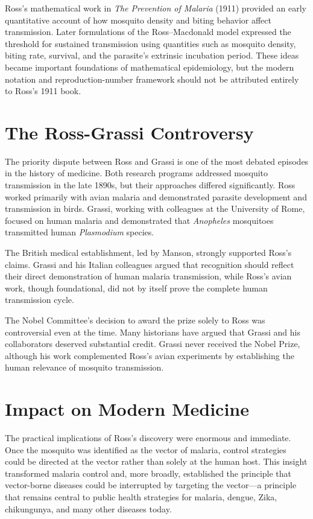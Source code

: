 Ross's mathematical work in \emph{The Prevention of Malaria} (1911) provided an early quantitative account of how mosquito density and biting behavior affect transmission. Later formulations of the Ross--Macdonald model expressed the threshold for sustained transmission using quantities such as mosquito density, biting rate, survival, and the parasite's extrinsic incubation period. These ideas became important foundations of mathematical epidemiology, but the modern notation and reproduction-number framework should not be attributed entirely to Ross's 1911 book.\cite{malaria-modeling}

\section{The Ross-Grassi Controversy}

The priority dispute between Ross and Grassi is one of the most debated episodes in the history of medicine. Both research programs addressed mosquito transmission in the late 1890s, but their approaches differed significantly. Ross worked primarily with avian malaria and demonstrated parasite development and transmission in birds. Grassi, working with colleagues at the University of Rome, focused on human malaria and demonstrated that \emph{Anopheles} mosquitoes transmitted human \emph{Plasmodium} species.\cite{malaria-history}

The British medical establishment, led by Manson, strongly supported Ross's claims. Grassi and his Italian colleagues argued that recognition should reflect their direct demonstration of human malaria transmission, while Ross's avian work, though foundational, did not by itself prove the complete human transmission cycle.

The Nobel Committee's decision to award the prize solely to Ross was controversial even at the time. Many historians have argued that Grassi and his collaborators deserved substantial credit. Grassi never received the Nobel Prize, although his work complemented Ross's avian experiments by establishing the human relevance of mosquito transmission.

\section{Impact on Modern Medicine}

The practical implications of Ross's discovery were enormous and immediate. Once the mosquito was identified as the vector of malaria, control strategies could be directed at the vector rather than solely at the human host. This insight transformed malaria control and, more broadly, established the principle that vector-borne diseases could be interrupted by targeting the vector---a principle that remains central to public health strategies for malaria, dengue, Zika, chikungunya, and many other diseases today.

